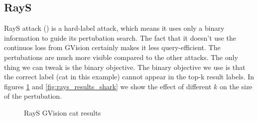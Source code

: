 \cite{Huang2020BlackBoxAA}


\subsection{RayS}
\label{rays_poc}

RayS attack (\cite{Chen2020RaySAR}) is a hard-label attack, which means it uses only a binary information to guide its pertubation search. The fact that it doesn't use the continuos loss from GVision certainly makes it less query-efficient. The pertubations are much more visible compared to the other attacks. The only thing we can tweak is the binary objective. The binary objective we use is that the correct label (cat in this example) cannot appear in the top-k result labels. In figures \ref{fig:rays_results_cat} and \ref{fig:rays_results_shark} we show the effect of different $k$ on the size of the pertubation.


\begin{figure}
\centering
 \hfill
 \hfill

\caption{RayS GVision cat results}
\label{fig:rays_results_cat}
\end{figure}


